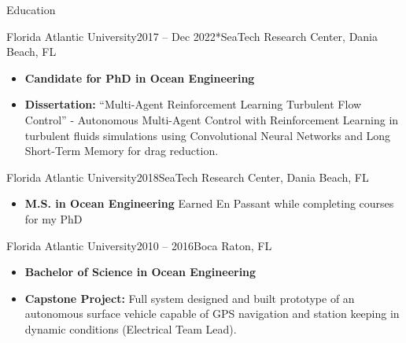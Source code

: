 \documentclass[]{mcdowellcv}
\begin{document}
	\makeheader
	

\begin{cvsection}{Education}
		\begin{cvsubsection}{Florida Atlantic University}{}{2017 -- Dec 2022*}{SeaTech Research Center, Dania Beach, FL}
			\begin{itemize}
				\item \textbf{Candidate for PhD in Ocean Engineering}
				\item \textbf{Dissertation:} ``Multi-Agent Reinforcement Learning Turbulent Flow Control'' - Autonomous Multi-Agent Control with Reinforcement Learning in turbulent fluids simulations using Convolutional Neural Networks and Long Short-Term Memory for drag reduction.
			\end{itemize}
		\end{cvsubsection}
		\begin{cvsubsection}{Florida Atlantic University}{}{2018}{SeaTech Research Center, Dania Beach, FL}
			\begin{itemize}
				\item \textbf{M.S. in Ocean Engineering} Earned En Passant while completing courses for my PhD
			\end{itemize}
		\end{cvsubsection}				
		\begin{cvsubsection}{Florida Atlantic University}{}{2010 -- 2016}{Boca Raton, FL}
			\begin{itemize}
				\item \textbf{Bachelor of Science in Ocean Engineering}
				\item \textbf{Capstone Project:} Full system designed and built prototype of an autonomous surface vehicle capable of GPS navigation and station keeping in dynamic conditions (Electrical Team Lead).
			\end{itemize}
		\end{cvsubsection}
	\end{cvsection}
	
\end{document}
